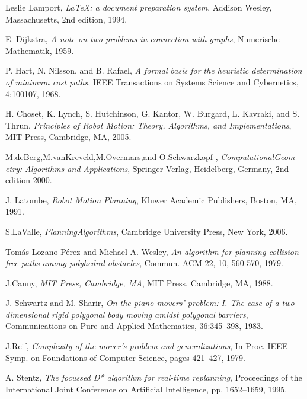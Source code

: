 \documentclass[MTech]{iitmdiss}
\begin{document}
\begin{thebibliography}{99}

  Leslie Lamport,
  \emph{\LaTeX: a document preparation system},
  Addison Wesley, Massachusetts,
  2nd edition,
  1994.

	E. Dijkstra, 
  \emph{A note on two problems in connection with graphs},
	Numerische Mathematik,
  1959.

	P. Hart, N. Nilsson, and B. Rafael, 
  \emph{A formal basis for the heuristic determination of minimum cost paths},
	IEEE Transactions on Systems Science and Cybernetics, 4:100107,
	 1968.


	H. Choset, K. Lynch, S. Hutchinson, G. Kantor, W. Burgard, L. Kavraki, and S. Thrun,
  \emph{Principles of Robot Motion: Theory, Algorithms, and Implementations},
	MIT Press, Cambridge, MA,
	 2005.
	 
 M.deBerg,M.vanKreveld,M.Overmars,and O.Schwarzkopf ,
  \emph{ComputationalGeom- etry: Algorithms and Applications},
	Springer-Verlag, Heidelberg, Germany, 2nd edition
	 2000.

	J. Latombe,
  \emph{Robot Motion Planning},
	Kluwer Academic Publishers, Boston, MA,
	 1991.
	 
	S.LaValle,
  \emph{PlanningAlgorithms},
	Cambridge University Press, New York,
	 2006.

	Tomás Lozano-Pérez and Michael A. Wesley,
  \emph{An algorithm for planning collision-free paths among polyhedral obstacles},
	Commun. ACM 22, 10, 560-570,
	 1979.

  J.Canny,
  \emph{MIT Press, Cambridge, MA},
	MIT Press, Cambridge, MA,
	 1988.

	J. Schwartz and M. Sharir,
  \emph{On the piano movers’ problem: I. The case of a two-dimensional rigid polygonal body moving amidst polygonal barriers},
	Communications on Pure and Applied Mathematics, 36:345–398,
	 1983.

	J.Reif,
  \emph{Complexity of the mover’s problem and generalizations},
	 In Proc. IEEE Symp. on Foundations of Computer Science, pages 421–427,
	 1979.


	A. Stentz,
  \emph{The focussed D* algorithm for real-time replanning},
	 Proceedings of the International Joint Conference on Artificial Intelligence, pp. 1652–1659,
	 1995.


\end{thebibliography}
\end{document}
